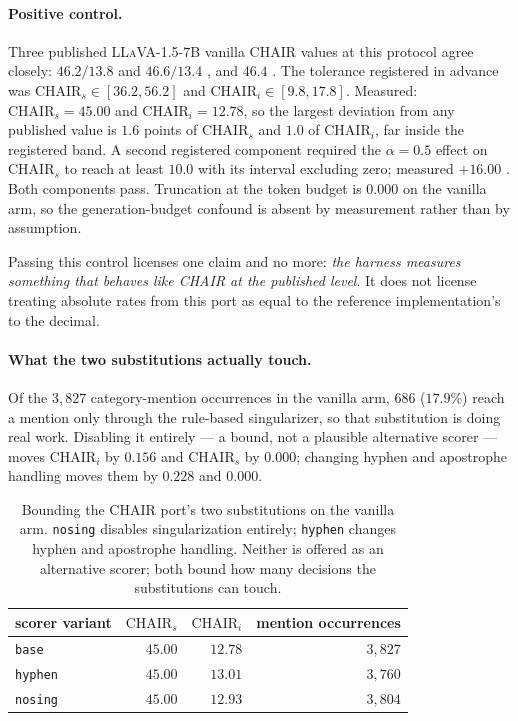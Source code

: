 \paragraph{Positive control.} Three published \textsc{LLaVA-1.5-7B} vanilla CHAIR values at this
protocol agree closely: $46.2 / 13.8$ and $46.6 / 13.4$ \citep{pai}, and $46.4$ \citep{vista}. The
tolerance registered in advance was $\mathrm{CHAIR}_s \in [36.2, 56.2]$ and
$\mathrm{CHAIR}_i \in [9.8, 17.8]$. Measured: $\mathrm{CHAIR}_s = 45.00$ and
$\mathrm{CHAIR}_i = 12.78$, so the largest deviation from any published value is $1.6$ points of
$\mathrm{CHAIR}_s$ and $1.0$ of $\mathrm{CHAIR}_i$, far inside the registered band. A second
registered component required the $\alpha = 0.5$ effect on $\mathrm{CHAIR}_s$ to reach at least
$10.0$ with its interval excluding zero; measured $+16.00$ . Both components
pass. Truncation at the token budget is $0.000$ on the vanilla arm, so the generation-budget
confound is absent by measurement rather than by assumption.

Passing this control licenses one claim and no more: \emph{the harness measures something that
behaves like CHAIR at the published level}. It does not license treating absolute rates from this
port as equal to the reference implementation's to the decimal.

\paragraph{What the two substitutions actually touch.} Of the $3{,}827$ category-mention occurrences
in the vanilla arm, $686$ ($17.9\%$) reach a mention only through the rule-based singularizer, so
that substitution is doing real work. Disabling it entirely --- a bound, not a plausible alternative
scorer --- moves $\mathrm{CHAIR}_i$ by $0.156$ and $\mathrm{CHAIR}_s$ by $0.000$; changing
hyphen and apostrophe handling moves them by $0.228$ and $0.000$.

\begin{table}[htb]
\caption{Bounding the CHAIR port's two substitutions on the vanilla arm. \texttt{nosing} disables
singularization entirely; \texttt{hyphen} changes hyphen and apostrophe handling. Neither is offered
as an alternative scorer; both bound how many decisions the substitutions can touch.}
\label{tab:mdport}
\begin{center}
\small
\begin{tabular}{lrrr}
\toprule
scorer variant & $\mathrm{CHAIR}_s$ & $\mathrm{CHAIR}_i$ & mention occurrences \\
\midrule
\texttt{base} & $45.00$ & $12.78$ & $3{,}827$ \\
\texttt{hyphen} & $45.00$ & $13.01$ & $3{,}760$ \\
\texttt{nosing} & $45.00$ & $12.93$ & $3{,}804$ \\
\bottomrule
\end{tabular}
\end{center}
\end{table}


